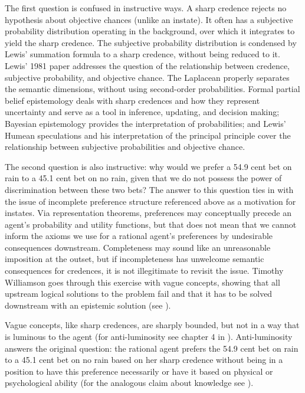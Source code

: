 \documentclass[11pt]{article}
\begin{document}
The first question is confused in instructive ways. A sharp credence
rejects no hypothesis about objective chances (unlike an instate). It
often has a subjective probability distribution operating in the
background, over which it integrates to yield the sharp credence. The
subjective probability distribution is condensed by Lewis' summation
formula to a sharp credence, without being reduced to it. Lewis' 1981
paper  addresses the
question of the relationship between credence, subjective probability,
and objective chance. The Laplacean properly separates the semantic
dimensions, without using second-order probabilities. Formal partial
belief epistemology deals with sharp credences and how they represent
uncertainty and serve as a tool in inference, updating, and decision
making; Bayesian epistemology provides the interpretation of
probabilities; and Lewis' Humean speculations and his interpretation
of the principal principle cover the relationship between subjective
probabilities and objective chance.

The second question is also instructive: why would we prefer a 54.9
cent bet on rain to a 45.1 cent bet on no rain, given that we do not
possess the power of discrimination between these two bets? The answer
to this question ties in with the issue of incomplete preference
structure referenced above as a motivation for instates. Via
representation theorems, preferences may conceptually precede an
agent's probability and utility functions, but that does not mean that
we cannot inform the axioms we use for a rational agent's preferences
by undesirable consequences downstream. Completeness may sound like an
unreasonable imposition at the outset, but if incompleteness has
unwelcome semantic consequences for credences, it is not illegitimate
to revisit the issue. Timothy Williamson goes through this exercise
with vague concepts, showing that all upstream logical solutions to
the problem fail and that it has to be solved downstream with an
epistemic solution (see ).

Vague concepts, like sharp credences, are sharply bounded, but not in
a way that is luminous to the agent (for anti-luminosity see chapter 4
in ). Anti-luminosity answers the original
question: the rational agent prefers the 54.9 cent bet on rain to a
45.1 cent bet on no rain based on her sharp credence without being in
a position to have this preference necessarily or have it based on
physical or psychological ability (for the analogous claim about
knowledge see ).
\end{document}
